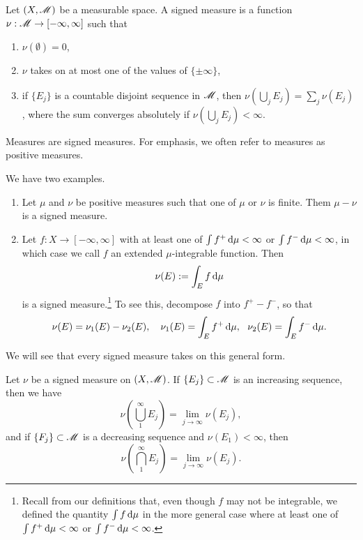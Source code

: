 \documentclass[12pt]{article} %
\begin{document}
\begin{definition}
    Let $(X, \mathscr{M})$ be a measurable space. A signed measure is a function $\nu : \mathscr{M} \to [-\infty, \infty]$ such that \begin{enumerate}
        \item $\nu(\emptyset) = 0$,
        \item $\nu$ takes on at most one of the values of $\{\pm \infty\}$,
        \item if $\{E_j\}$ is a countable disjoint sequence in $\mathscr{M}$, then $\nu(\bigcup_j E_j) = \sum_j \nu(E_j)$, where the sum converges absolutely if $\nu(\bigcup_j E_j) < \infty$.
    \end{enumerate}
\end{definition}

\begin{remark}
    Measures are signed measures. For emphasis, we often refer to measures as positive measures.
\end{remark}

\begin{example}
    We have two examples.
    \begin{enumerate}
        \item Let $\mu$ and $\nu$ be positive measures such that one of $\mu$ or $\nu$ is finite. Them $\mu - \nu$ is a signed measure.
        \item Let $f : X \to [-\infty,\infty]$ with at least one of $\int f^+ \, \mathrm{d} \mu < \infty$ or $\int f^- \, \mathrm{d} \mu < \infty$, in which case we call $f$ an extended $\mu$-integrable function. Then \[\nu(E) := \int_E f \, \mathrm{d} \mu\] is a signed measure.\footnote{Recall from our definitions that, even though $f$ may not be integrable, we defined the quantity $\int f \, \mathrm{d}\mu$ in the more general case where at least one of $\int f^+ \, \mathrm{d} \mu < \infty$ or $\int f^- \, \mathrm{d} \mu < \infty$.} To see this, decompose $f$ into $f^+ - f^-$, so that \[\nu(E) = \nu_1(E) - \nu_2(E), \ \ \ \nu_1(E) = \int_E f^+\d\mu, \ \ \nu_2(E) = \int_E f^- \d \mu.\]
    \end{enumerate}
    We will see that every signed measure takes on this general form.
\end{example}

\begin{proposition}
    Let $\nu$ be a signed measure on $(X, \mathscr{M})$. If $\{E_j\} \subset \mathscr{M}$ is an increasing sequence, then we have \[\nu\left(\bigcup_1^\infty E_j \right) = \lim_{j \to \infty} \nu(E_j),\] and if $\{F_j\} \subset \mathscr{M}$ is a decreasing sequence and $\nu(E_1) < \infty$, then \[\nu\left(\bigcap_1^\infty E_j \right) = \lim_{j \to \infty} \nu(E_j).\]
\end{proposition}
\end{document}
